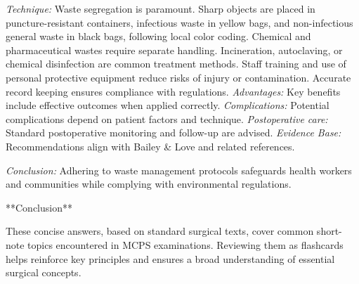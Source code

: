 \documentclass{article}
\begin{document}
\emph{Technique:} Waste segregation is paramount. Sharp objects are placed in puncture-resistant containers, infectious waste in yellow bags, and non-infectious general waste in black bags, following local color coding. Chemical and pharmaceutical wastes require separate handling. Incineration, autoclaving, or chemical disinfection are common treatment methods. Staff training and use of personal protective equipment reduce risks of injury or contamination. Accurate record keeping ensures compliance with regulations.
\emph{Advantages:} Key benefits include effective outcomes when applied correctly.
\emph{Complications:} Potential complications depend on patient factors and technique.
\emph{Postoperative care:} Standard postoperative monitoring and follow-up are advised.
\emph{Evidence Base:} Recommendations align with Bailey & Love and related references.

\emph{Conclusion:} Adhering to waste management protocols safeguards health workers and communities while complying with environmental regulations.


**Conclusion**

These concise answers, based on standard surgical texts, cover common short-note topics encountered in MCPS examinations. Reviewing them as flashcards helps reinforce key principles and ensures a broad understanding of essential surgical concepts.
\end{document}
